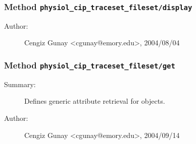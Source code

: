 \subsubsection[Method \texttt{display}]{Method \texttt{physiol\_cip\_traceset\_fileset/display}}%
%
\label{ref_physiol_cip_traceset_fileset__display}%
\hypertarget{ref_physiol_cip_traceset_fileset__display}{}%
\begin{description}
%
%
%
%
%
%
%
\item[Author:]%
Cengiz Gunay <cgunay@emory.edu>, 2004/08/04
%
\end{description}
\methodline%
\subsubsection[Method \texttt{get}]{Method \texttt{physiol\_cip\_traceset\_fileset/get}}%
%
\label{ref_physiol_cip_traceset_fileset__get}%
\hypertarget{ref_physiol_cip_traceset_fileset__get}{}%
\begin{description}
\item[Summary:]Defines generic attribute retrieval for objects.
%
%
%
%
%
%
%
\item[Author:]%
Cengiz Gunay <cgunay@emory.edu>, 2004/09/14
%
\end{description}
\methodline%
